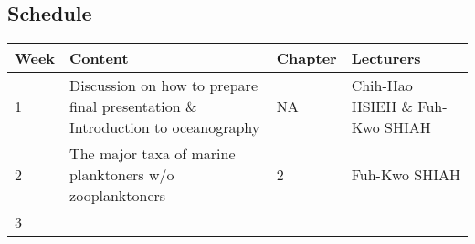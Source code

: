 \documentclass[
]{article}
\begin{document}
\hypertarget{schedule}{%
\subsection{Schedule}\label{schedule}}

\begin{longtable}[]{@{}llll@{}}
\toprule
\begin{minipage}[b]{0.13\columnwidth}\raggedright
Week\strut
\end{minipage} & \begin{minipage}[b]{0.23\columnwidth}\raggedright
Content\strut
\end{minipage} & \begin{minipage}[b]{0.23\columnwidth}\raggedright
Chapter\strut
\end{minipage} & \begin{minipage}[b]{0.30\columnwidth}\raggedright
Lecturers\strut
\end{minipage}\tabularnewline
\midrule
\endhead
\begin{minipage}[t]{0.13\columnwidth}\raggedright
1\strut
\end{minipage} & \begin{minipage}[t]{0.23\columnwidth}\raggedright
Discussion on how to prepare final presentation \& Introduction to
oceanography\strut
\end{minipage} & \begin{minipage}[t]{0.23\columnwidth}\raggedright
NA\strut
\end{minipage} & \begin{minipage}[t]{0.30\columnwidth}\raggedright
Chih-Hao HSIEH \& Fuh-Kwo SHIAH\strut
\end{minipage}\tabularnewline
\begin{minipage}[t]{0.13\columnwidth}\raggedright
2\strut
\end{minipage} & \begin{minipage}[t]{0.23\columnwidth}\raggedright
The major taxa of marine planktoners w/o zooplanktoners\strut
\end{minipage} & \begin{minipage}[t]{0.23\columnwidth}\raggedright
2\strut
\end{minipage} & \begin{minipage}[t]{0.30\columnwidth}\raggedright
Fuh-Kwo SHIAH\strut
\end{minipage}\tabularnewline
\begin{minipage}[t]{0.13\columnwidth}\raggedright
3\strut
\end{minipage} & \begin{minipage}[t]{0.23\columnwidth}\raggedright

\end{minipage}
\end{longtable}
\end{document}
